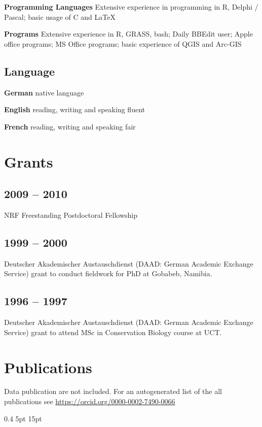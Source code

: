 \documentclass[a4paper]{article}
\begin{document}
\textbf{Programming Languages} Extensive experience in programming in R,
Delphi / Pascal; basic usage of C and \LaTeX{}

\textbf{Programs} Extensive experience in R, GRASS, bash; Daily BBEdit user; Apple office programs; MS
Office programs; basic experience of QGIS and Arc-GIS

\subsection{Language}

\textbf{German} native language

\textbf{English} reading, writing and speaking fluent

\textbf{French} reading, writing and speaking fair

\section{Grants}

\subsection{2009 -- 2010}

NRF Freestanding Postdoctoral Fellowship

\subsection{1999 -- 2000}

Deutscher Akademischer Austauschdienst (DAAD: German Academic Exchange
Service) grant to conduct fieldwork for PhD at Gobabeb, Namibia.

\subsection{1996 -- 1997}

Deutscher Akademischer Austauschdienst (DAAD: German Academic Exchange
Service) grant to attend MSc in Conservation Biology course at UCT.

\section{Publications}

Data publication are not included. For an autogenerated list of the all publications see \url{https://orcid.org/0000-0002-7490-0066}

\titlespacing{\subsection}
            {0.4\textwidth}%
            {5pt}%
            {15pt}%
\end{document}
